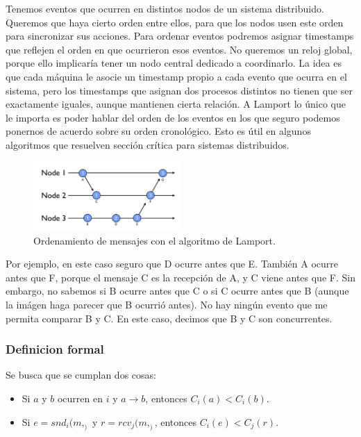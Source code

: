 \documentclass{article}
\begin{document}
Tenemos eventos que ocurren en distintos nodos de un sistema distribuido. Queremos que haya cierto orden entre ellos, para que los nodos usen este orden para sincronizar sus acciones. Para ordenar eventos podremos asignar timestamps que reflejen el orden en que ocurrieron esos eventos. No queremos un reloj global, porque ello implicaría tener un nodo central dedicado a coordinarlo. La idea es que cada máquina le asocie un timestamp propio a cada evento que ocurra en el sistema, pero los timestamps que asignan dos procesos distintos no tienen que ser exactamente iguales, aunque mantienen cierta relación. A Lamport lo único que le importa es poder hablar del orden de los eventos en los que seguro podemos ponernos de acuerdo sobre su orden cronológico. Esto es útil en algunos algoritmos que resuelven sección crítica para sistemas distribuidos.

\begin{figure}[H]
    \centering
    \includegraphics[width=0.5\textwidth]{imgs/message_ordering_lamport.png}
    \caption{Ordenamiento de mensajes con el algoritmo de Lamport.}
    \label{fig:message_ordering_lamport}
\end{figure}

Por ejemplo, en este caso seguro que D ocurre antes que E. También A ocurre antes que F, porque el mensaje C es la recepción de A, y C viene antes que F. Sin embargo, no sabemos si B ocurre antes que C o si C ocurre antes que B (aunque la imágen haga parecer que B ocurrió antes). No hay ningún evento que me permita comparar B y C. En este caso, decimos que B y C son concurrentes.

\subsubsection{Definicion formal}

Se busca que se cumplan dos cosas:

\begin{itemize}
 \item Si $a$ y $b$ ocurren en $i$ y $a \rightarrow b$, entonces $C_i(a) < C_i(b)$.
 \item Si $e = snd_i(m, _)$ y $r = rcv_j(m, _)$, entonces $C_i(e) < C_j(r)$.
\end{itemize}
\end{document}
